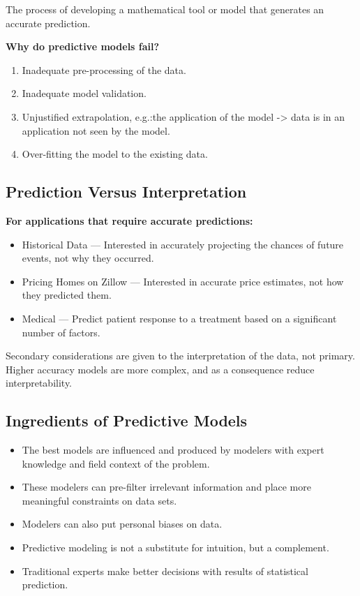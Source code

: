 \documentclass[../main.tex]{subfiles}
\begin{document}
    \begin{definition}
        The process of developing a mathematical tool or model that generates an accurate prediction.
    \end{definition}

    \textbf{Why do predictive models fail?}
    \begin{enumerate}
        \item Inadequate pre-processing of the data.
        \item Inadequate model validation.
        \item Unjustified extrapolation, e.g.:the application of the model -> data is in an application not seen by the model.
        \item Over-fitting the model to the existing data.
    \end{enumerate}

\subsection{Prediction Versus Interpretation}
    \textbf{For applications that require accurate predictions:}
    \begin{itemize}
        \item Historical Data --- Interested in accurately projecting the chances of future events, not why they occurred.
        \item Pricing Homes on Zillow --- Interested in accurate price estimates, not how they predicted them.
        \item Medical --- Predict patient response to a treatment based on a significant number of factors.  
    \end{itemize}
    Secondary considerations are given to the interpretation of the data, not primary. 
    Higher accuracy models are more complex, and as a consequence reduce interpretability.

\subsection{Ingredients of Predictive Models}
    \begin{itemize}
        \item The best models are influenced and produced by modelers with expert knowledge and field context of the problem.
        \item These modelers can pre-filter irrelevant information and place more meaningful constraints on data sets.
        \item Modelers can also put personal biases on data.
        \item Predictive modeling is not a substitute for intuition, but a complement.
        \item Traditional experts make better decisions with results of statistical prediction.
    \end{itemize}
\end{document}
